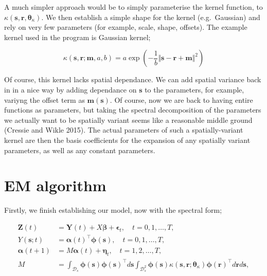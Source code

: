 \documentclass[
  letterpaper,
  DIV=11,
  numbers=noendperiod]{scrartcl}
\begin{document}
A much simpler approach would be to simply parameterise the kernel
function, to
\(\kappa(\boldsymbol{\mathbf{s}}, \boldsymbol{\mathbf{r}}, \boldsymbol{\mathbf{\theta}}_\kappa)\).
We then establish a simple shape for the kernel (e.g.~Gaussian) and rely
on very few parameters (for example, scale, shape, offsets). The example
kernel used in the program is Gaussian kernel;

\[
\kappa(\boldsymbol{\mathbf{s}}, \boldsymbol{\mathbf{r}}; \boldsymbol{\mathbf{m}}, a, b) = a \exp \left( -\frac{1}{b} \Vert \boldsymbol{\mathbf{s}}- \boldsymbol{\mathbf{r}} +\boldsymbol{\mathbf{m}}\Vert^2 \right)
\]

Of course, this kernel lacks spatial dependance. We can add spatial
variance back in in a nice way by adding dependance on
\(\boldsymbol{\mathbf{s}}\) to the parameters, for example, variyng the
offset term as \(\boldsymbol{\mathbf{m}}(\boldsymbol{\mathbf{s}})\). Of
course, now we are back to having entire functions as parameters, but
taking the spectral decomposition of the parameters we actually want to
be spatially variant seems like a reasonable middle ground (Cressie and
Wikle 2015). The actual parameters of such a spatially-variant kernel
are then the basis coefficients for the expansion of any spatially
variant parameters, as well as any constant parameters.

\section{EM algorithm}\label{em-algorithm}

Firstly, we finish establishing our model, now with the spectral form;

\[
\begin{split}
\boldsymbol{\mathbf{Z}}(t) &= \boldsymbol{\mathbf{Y}}(t) + X \boldsymbol{\mathbf{\beta }}+ \boldsymbol{\mathbf{\epsilon}}_t, \quad t=0,1,\dots, T,\\
Y(\boldsymbol{\mathbf{s}};t) &= \boldsymbol{\mathbf{\alpha}}(t)^\intercal \boldsymbol{\mathbf{\phi}}(\boldsymbol{\mathbf{s}}), \quad t = 0,1,\dots, T,\\
\boldsymbol{\mathbf{\alpha}}(t+1) &= M\boldsymbol{\mathbf{\alpha}}(t) + \boldsymbol{\mathbf{\eta}}_t,\quad t = 1,2,\dots, T,\\
M &= \int_{\mathcal D_s}\boldsymbol{\mathbf{\phi}}(\boldsymbol{\mathbf{s}}) \boldsymbol{\mathbf{\phi}}(\boldsymbol{\mathbf{s}})^\intercal d\boldsymbol{\mathbf{s}} \int_{\mathcal D_s^2}\boldsymbol{\mathbf{\phi}}(\boldsymbol{\mathbf{s}}) \kappa(\boldsymbol{\mathbf{s}}, \boldsymbol{\mathbf{r}}; \boldsymbol{\mathbf{\theta}}_\kappa)\boldsymbol{\mathbf{\phi}}(\boldsymbol{\mathbf{r}})^\intercal d\boldsymbol{\mathbf{r}} d \boldsymbol{\mathbf{s}},
\end{split}
\]
\end{document}

